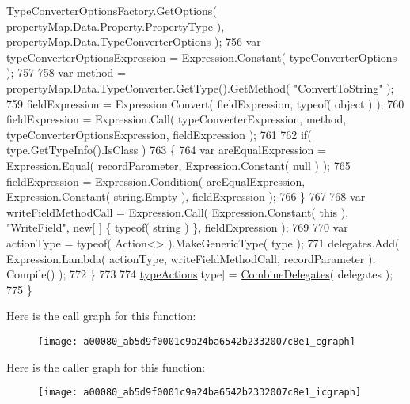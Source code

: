 \begin{DoxyCode}
      TypeConverterOptionsFactory.GetOptions( propertyMap.Data.Property.PropertyType ), propertyMap.Data.TypeConverterOptions );
756                 var typeConverterOptionsExpression = Expression.Constant( typeConverterOptions );
757 
758                 var method = propertyMap.Data.TypeConverter.GetType().GetMethod( \textcolor{stringliteral}{"ConvertToString"} );
759                 fieldExpression = Expression.Convert( fieldExpression, typeof( \textcolor{keywordtype}{object} ) );
760                 fieldExpression = Expression.Call( typeConverterExpression, method, 
      typeConverterOptionsExpression, fieldExpression );
761 
762                 \textcolor{keywordflow}{if}( type.GetTypeInfo().IsClass )
763                 \{
764                     var areEqualExpression = Expression.Equal( recordParameter, Expression.Constant( null )
       );
765                     fieldExpression = Expression.Condition( areEqualExpression, Expression.Constant( 
      string.Empty ), fieldExpression );
766                 \}
767 
768                 var writeFieldMethodCall = Expression.Call( Expression.Constant( this ), \textcolor{stringliteral}{"WriteField"}, \textcolor{keyword}{new}[
      ] \{ typeof( \textcolor{keywordtype}{string} ) \}, fieldExpression );
769 
770                 var actionType = typeof( Action<> ).MakeGenericType( type );
771                 delegates.Add( Expression.Lambda( actionType, writeFieldMethodCall, recordParameter ).
      Compile() );
772             \}
773 
774             \hyperlink{a00080_a93af56d83ee3a76d1d3ce39f9c344d15}{typeActions}[type] = \hyperlink{a00080_ab6cbf58f5e59e5d6091a89e4e778f11b}{CombineDelegates}( delegates );
775         \}
\end{DoxyCode}


Here is the call graph for this function\-:
\nopagebreak
\begin{figure}[H]
\begin{center}
\leavevmode
\texttt{[image: a00080\_ab5d9f0001c9a24ba6542b2332007c8e1\_cgraph]}
\end{center}
\end{figure}




Here is the caller graph for this function\-:
\nopagebreak
\begin{figure}[H]
\begin{center}
\leavevmode
\texttt{[image: a00080\_ab5d9f0001c9a24ba6542b2332007c8e1\_icgraph]}
\end{center}
\end{figure}


